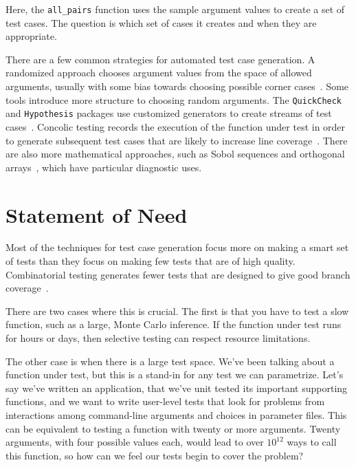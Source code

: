 \documentclass{juliacon}
\begin{document}
Here, the \verb|all_pairs| function uses the sample argument values to create a set of test cases. The question is which set of cases it creates and when they are appropriate.

\vskip 6pt
There are a few common strategies for automated test case generation. A randomized approach chooses argument values from the space of allowed arguments, usually with some bias towards choosing possible corner cases~\cite{Lampropoulos2020-sd,Arcuri2012-az}. Some tools introduce more structure to choosing random arguments. The \texttt{QuickCheck} and \texttt{Hypothesis} packages use customized generators to create streams of test cases~\cite{loscher2018automating}. Concolic testing records the execution of the function under test in order to generate subsequent test cases that are likely to increase line coverage~\cite{King1976-jt,Wang2018-xh,vira2019}. There are also more mathematical approaches, such as Sobol sequences and orthogonal arrays~\cite{He2013-th}, which have particular diagnostic uses.


\section{Statement of Need}

Most of the techniques for test case generation focus more on making a smart set of tests than they focus on making few tests that are of high quality. Combinatorial testing generates fewer tests that are designed to give good branch coverage~\cite{Nie2011-yl,Grindal2005-su,Kuhn2010-ak}.

\vskip 6pt
There are two cases where this is crucial. The first is that you have to test a slow function, such as a large, Monte Carlo inference. If the function under test runs for hours or days, then selective testing can respect resource limitations.

\vskip 6pt
The other case is when there is a large test space. We've been talking about a function under test, but this is a stand-in for any test we can parametrize. Let's say we've written an application, that we've unit tested its important supporting functions, and we want to write user-level tests that look for problems from interactions among command-line arguments and choices in parameter files. This can be equivalent to testing a function with twenty or more arguments. Twenty arguments, with four possible values each, would lead to over $10^{12}$ ways to call this function, so how can we feel our tests begin to cover the problem?
\end{document}
